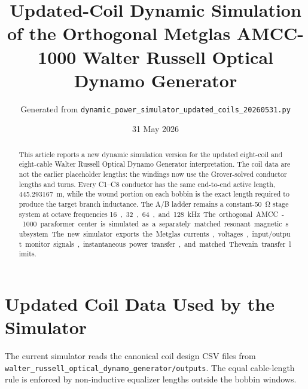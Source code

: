 \documentclass[11pt]{article}
\title{Updated-Coil Dynamic Simulation of the Orthogonal Metglas AMCC-1000 Walter Russell Optical Dynamo Generator}
\author{Generated from \texttt{dynamic\_power\_simulator\_updated\_coils\_20260531.py}}
\date{31 May 2026}
\begin{document}
\maketitle

\begin{abstract}
This article reports a new dynamic simulation version for the updated eight-coil
and eight-cable Walter Russell Optical Dynamo Generator interpretation.  The
coil data are not the earlier placeholder lengths: the windings now use the
Grover-solved conductor lengths and turns.  Every C1--C8 conductor has the same
end-to-end active length, \SI{445.293167}{m}, while the wound portion on
each bobbin is the exact length required to produce the target branch
inductance.  The A/B ladder remains a constant-\SI{50}{\ohm} stage system
at octave frequencies \SI{16}, \SI{32}, \SI{64}, and \SI{128}{kHz}.
The orthogonal AMCC-1000 paraformer center is simulated as a separately matched
resonant magnetic subsystem.  The new simulator exports the Metglas currents,
voltages, input/output monitor signals, instantaneous power transfer, and
matched Thevenin transfer limits.
\end{abstract}

\section{Updated Coil Data Used by the Simulator}
The current simulator reads the canonical coil design CSV files from
\texttt{walter\_russell\_optical\_dynamo\_generator/outputs}.  The equal
cable-length rule is enforced by non-inductive equalizer lengths outside the
bobbin windows.

\end{document}
